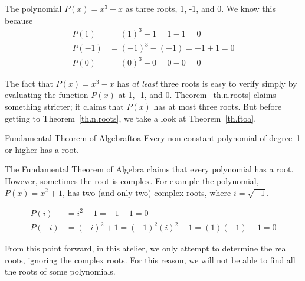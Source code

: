 The polynomial $P(x) = x^3 - x$ as three roots, 1, -1, and 0.  We know
this because
\begin{align*}
  P(1) &= (1)^3 - 1 
  = 1 - 1 
  = 0\\[3pt]
  P(-1) &= (-1)^3 - (-1) 
  = -1 + 1 
  = 0\\[3pt]
  P(0) &= (0)^3 - 0
  = 0 - 0 
  = 0  
\end{align*}

The fact that $P(x) = x^3 - x$ has \emph{at least} three roots is easy
to verify simply by evaluating the function $P(x)$ at 1, -1, and 0.
Theorem~\ref{th.n.roots} claims something stricter; it claims that $P(x)$
has at most three roots.  But before getting to Theorem~\ref{th.n.roots}, we take a look at Theorem~\ref{th.ftoa}.


\begin{theorem}{Fundamental Theorem of Algebra}{ftoa}
  Every non-constant polynomial of degree~1 or higher has a root.
\end{theorem}

The Fundamental Theorem of Algebra claims that every polynomial has a root.
However, sometimes the root is complex.  For example the polynomial,
$P(x) = x^2 + 1$, has two (and only two) complex roots, where $i=\sqrt{-1}$.

\begin{align*}
  P(i) &= i^2 + 1 
  = -1 - 1 
  = 0\\[3pt]
  P(-i) &= (-i)^2 + 1 
  = (-1)^2(i)^2 + 1 = (1)(-1) + 1
  = 0
\end{align*}


From this point forward, in this atelier, we only
attempt to determine the real roots, ignoring the complex roots.  For
this reason, we will not be able to find all the roots of some
polynomials.

